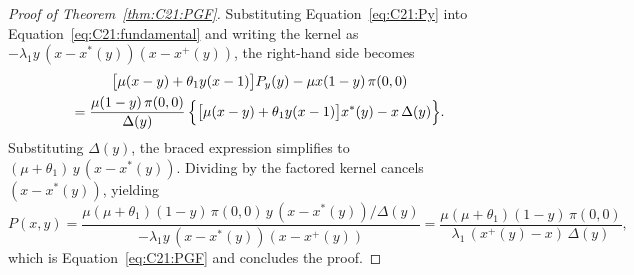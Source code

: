 \begin{proof}[Proof of Theorem~\ref{thm:C21:PGF}]
    Substituting Equation~\eqref{eq:C21:Py} into Equation~\eqref{eq:C21:fundamental} and writing the kernel as $-\lambda_1 y\,(x-x^*(y))(x-x^+(y))$, the right-hand side becomes
    \begin{multline*}
        \bigl[\mu(x-y)+\theta_1 y(x-1)\bigr]P_y(y) - \mu x(1-y)\,\pi(0,0) \\
        = \frac{\mu(1-y)\,\pi(0,0)}{\Delta(y)}\,
          \Bigl\{\bigl[\mu(x-y)+\theta_1 y(x-1)\bigr]x^*(y) - x\,\Delta(y)\Bigr\}.
    \end{multline*}
    Substituting $\Delta(y)$, the braced expression simplifies to $(\mu+\theta_1)\,y\,(x-x^*(y))$. Dividing by the factored kernel cancels $(x-x^*(y))$, yielding
    \begin{equation*}
        P(x,y) = \frac{\mu(\mu+\theta_1)(1-y)\,\pi(0,0)\,y\,(x-x^*(y))/\Delta(y)}
                      {-\lambda_1 y\,(x-x^*(y))(x-x^+(y))}
               = \frac{\mu(\mu+\theta_1)(1-y)\,\pi(0,0)}
                      {\lambda_1\,(x^+(y)-x)\,\Delta(y)},
    \end{equation*}
    which is Equation~\eqref{eq:C21:PGF} and concludes the proof.
\end{proof}

